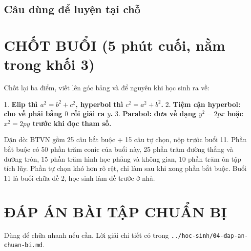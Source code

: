 \documentclass[11pt, a4paper]{article}
\begin{document}
\subsection{Câu dùng để luyện tại chỗ}


\section{CHỐT BUỔI (5 phút cuối, nằm trong khối 3)}

Chốt lại ba điểm, viết lên góc bảng và để nguyên khi học sinh ra về:

1. \textbf{Elip thì $a^2 = b^2 + c^2$, hyperbol thì $c^2 = a^2 + b^2$.}
2. \textbf{Tiệm cận hyperbol: cho vế phải bằng $0$ rồi giải ra $y$.}
3. \textbf{Parabol: đưa về dạng $y^2 = 2px$ hoặc $x^2 = 2py$ trước khi đọc tham số.}

Dặn dò: BTVN gồm 25 câu bắt buộc + 15 câu tự chọn, nộp trước buổi 11. Phần bắt buộc có 50 phần trăm conic của buổi này, 25 phần trăm đường thẳng và đường tròn, 15 phần trăm hình học phẳng và không gian, 10 phần trăm ôn tập tích lũy. Phần tự chọn khó hơn rõ rệt, chỉ làm sau khi xong phần bắt buộc. Buổi 11 là buổi chữa đề 2, học sinh làm đề trước ở nhà.

\section{ĐÁP ÁN BÀI TẬP CHUẨN BỊ}

Dùng để chữa nhanh nếu cần. Lời giải chi tiết có trong \texttt{../hoc-sinh/04-dap-an-chuan-bi.md}.
\end{document}
